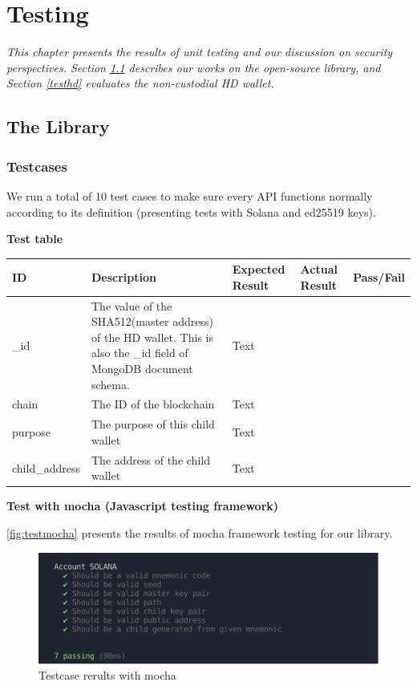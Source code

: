 \chapter{Testing}
\label{chap:testing}
\textit{This chapter presents the results of unit testing and our discussion on security perspectives. Section \ref{testlib} describes our works on the open-source library, and Section \ref{testhd} evaluates the non-custodial HD wallet.}

\minitoc

\section{The Library}
\label{testlib}
\subsection{Testcases}

We run a total of 10 test cases to make sure every API functions normally according to its definition (presenting tests with Solana and ed25519 keys). 

\bigskip
{\textbf{Test table}}
\bigskip

\begin{tabular}{| m{2cm} | m{6cm} | m{2cm} | m{2cm} | m{2cm} |}
    \hline
    ID & Description & Expected Result & Actual Result & Pass/Fail                                            \\ \hline
    \_id & The value of the SHA512(master address) of the HD wallet. This is also the \_id field of MongoDB document schema.  & Text   \\ \hline
    chain   & The ID of the blockchain & Text    \\ \hline
    purpose   & The purpose of this child wallet & Text    \\ \hline
    child\_address   & The address of the child wallet & Text    \\ \hline
\end{tabular}

\bigskip
{\textbf{Test with mocha (Javascript testing framework)}}

\bigskip
\autoref{fig:testmocha} presents the results of mocha framework testing for our library.
\bigskip

\begin{figure}[ht!]
    \centering
    \includegraphics[width=1\textwidth]{images/test_mocha.png}
    \caption[Testcase rerults with mocha]{Testcase rerults with mocha}
    \label{fig:testmocha}
\end{figure}


